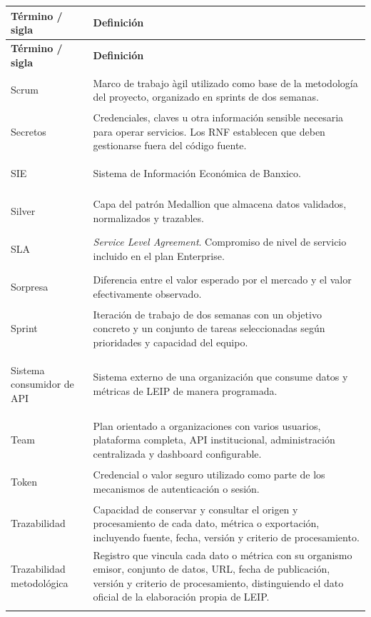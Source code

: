 \documentclass[11pt,a4paper]{article}
\makeatletter
\newcommand{\proyectoNombre}{LEIP}
\newenvironment{glosario}{%
  \renewcommand{\arraystretch}{1.18}%
  \begin{longtable}{@{}>{\raggedright\arraybackslash\bfseries}p{4.0cm} >{\raggedright\arraybackslash}p{10.7cm}@{}}
  \toprule
  \textbf{T\'ermino / sigla} & \textbf{Definici\'on} \\
  \midrule
  \endfirsthead
  \toprule
  \textbf{T\'ermino / sigla} & \textbf{Definici\'on} \\
  \midrule
  \endhead
  \bottomrule
  \endfoot
}{%
  \end{longtable}
  \renewcommand{\arraystretch}{1}%
}
\makeatother
\begin{document}
\begin{glosario}
Scrum & Marco de trabajo \`agil utilizado como base de la metodolog\'ia del proyecto, organizado en sprints de dos semanas. \\
\addlinespace

Secretos & Credenciales, claves u otra informaci\'on sensible necesaria para operar servicios. Los RNF establecen que deben gestionarse fuera del c\'odigo fuente. \\
\addlinespace

SIE & Sistema de Informaci\'on Econ\'omica de Banxico. \\
\addlinespace

Silver & Capa del patr\'on Medallion que almacena datos validados, normalizados y trazables. \\
\addlinespace

SLA & \emph{Service Level Agreement}. Compromiso de nivel de servicio incluido en el plan Enterprise. \\
\addlinespace

Sorpresa & Diferencia entre el valor esperado por el mercado y el valor efectivamente observado. \\
\addlinespace

Sprint & Iteraci\'on de trabajo de dos semanas con un objetivo concreto y un conjunto de tareas seleccionadas seg\'un prioridades y capacidad del equipo. \\
\addlinespace

Sistema consumidor de API & Sistema externo de una organizaci\'on que consume datos y m\'etricas de \proyectoNombre{} de manera programada. \\
\addlinespace

Team & Plan orientado a organizaciones con varios usuarios, plataforma completa, API institucional, administraci\'on centralizada y dashboard configurable. \\
\addlinespace

Token & Credencial o valor seguro utilizado como parte de los mecanismos de autenticaci\'on o sesi\'on. \\
\addlinespace

Trazabilidad & Capacidad de conservar y consultar el origen y procesamiento de cada dato, m\'etrica o exportaci\'on, incluyendo fuente, fecha, versi\'on y criterio de procesamiento. \\
\addlinespace

Trazabilidad metodol\'ogica & Registro que vincula cada dato o m\'etrica con su organismo emisor, conjunto de datos, URL, fecha de publicaci\'on, versi\'on y criterio de procesamiento, distinguiendo el dato oficial de la elaboraci\'on propia de \proyectoNombre{}. \\
\addlinespace


\end{glosario}
\end{document}
